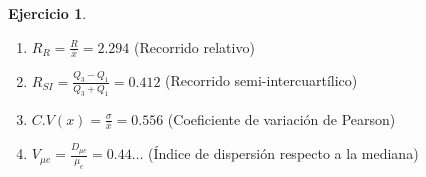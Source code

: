 \documentclass[a4paper, 12pt]{article}
\theoremstyle{definition}
\newtheorem{ej}{Ejercicio}
\begin{document}
\begin{ej}
\begin{enumerate}[label=\textit{\alph*)}]
\begin{enumerate}[label=\arabic*)]
        \begin{enumerate}[label=]
            \item \(R_R = \frac{R}{\overline{x}} = 2.294\) (Recorrido relativo)
            \item \(R_{SI} = \frac{Q_3 - Q_1}{Q_3 + Q_1} = 0.412\) (Recorrido semi-intercuartílico)
            \item \(C.V(x) = \frac{\sigma}{\overline{x}} = 0.556\) (Coeficiente de variación de Pearson)
            \item \(V_{\mu e} = \frac{D_{\mu e}}{\mu_e} = 0.44\dotsc\) (Índice de dispersión respecto a la mediana)
        \end{enumerate}
    \end{enumerate}
\end{enumerate}

\end{ej} 
\end{document}
